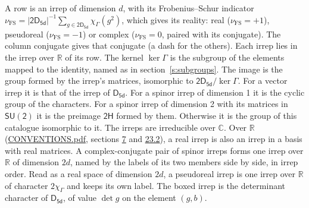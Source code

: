 \documentclass[10pt,a4paper]{article}
\numberwithin{equation}{section}
\newcommand{\grp}[1]{\mathsf{#1}}
\newcommand{\irchar}[1]{\chi_{#1}}
\newcommand{\fsind}{\nu_{\mathrm{FS}}}
\begin{document}
\leavevmode\label{n:index.frobenius}\label{n:head.irrep}\label{n:head.reality}A row is an irrep of dimension $d$, with its Frobenius--Schur indicator $\fsind = |\grp{2D_{5d}}|^{-1}\allowbreak\sum_{g\in\grp{2D_{5d}}}\irchar{\Gamma}(g^2)$, which gives its reality: real ($\fsind = +1$), pseudoreal ($\fsind = -1$) or complex ($\fsind = 0$, paired with its conjugate). \label{n:head.conjugate}The column conjugate gives that conjugate (a dash for the others). \label{n:head.over.real}Each irrep lies in the irrep over $\mathbb{R}$ of its row. \label{n:head.kernel}The kernel $\ker\Gamma$ is the subgroup of the elements mapped to the identity, named as in section~\ref{s:subgroups}. \label{n:head.image}The image is the group formed by the irrep's matrices, isomorphic to $\grp{2D_{5d}}/\ker\Gamma$. For a vector irrep it is that of the irrep of \href{../../../rotation/data/pdf/D5d.pdf}{$\grp{D_{5d}}$}. For a spinor irrep of dimension 1 it is the cyclic group of the characters. For a spinor irrep of dimension 2 with its matrices in $\grp{SU(2)}$ it is the preimage $\grp{2H}$ formed by them. Otherwise it is the group of this catalogue isomorphic to it. The irreps are irreducible over $\mathbb{C}$. Over $\mathbb{R}$ (\href{../../CONVENTIONS.pdf}{CONVENTIONS.pdf}, sections \href{../../../rotation/CONVENTIONS.pdf\#conv.7}{7} and \href{../../CONVENTIONS.pdf\#conv.23.2}{23.2}), a real irrep is also an irrep in a basis with real matrices. A complex-conjugate pair of spinor irreps forms one irrep over $\mathbb{R}$ of dimension $2d$, named by the labels of its two members side by side, in irrep order. Read as a real space of dimension $2d$, a pseudoreal irrep is one irrep over $\mathbb{R}$ of character $2\irchar{\Gamma}$ and keeps its own label. \label{n:mark.determinant}The boxed irrep is the determinant character of \href{../../../rotation/data/pdf/D5d.pdf}{$\grp{D_{5d}}$}, of value $\det g$ on the element $(g, b)$.
\setlength{\emergencystretch}{2em}\par\setlength{\emergencystretch}{0pt}
\end{document}
